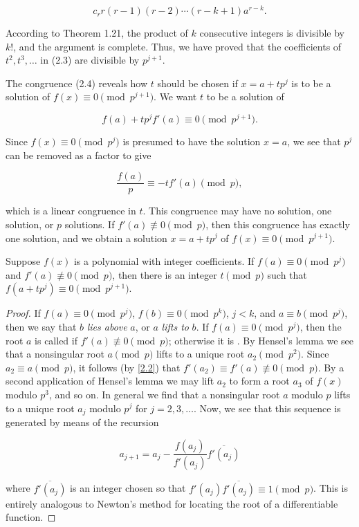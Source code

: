 \documentclass[11pt]{article}
\begin{document}
\[
	c_r r (r - 1)(r - 2) \cdots (r - k + 1) a^{r-k}.
\]

According to Theorem 1.21, the product of \( k \) consecutive integers is divisible by \( k! \), and the argument is complete. Thus, we have proved that the coefficients of \( t^2, t^3, \ldots \) in (2.3) are divisible by \( p^{j+1} \).

The congruence (2.4) reveals how \( t \) should be chosen if \( x = a + tp^j \) is to be a solution of \( f(x) \equiv 0 \pmod{p^{j+1}} \). We want \( t \) to be a solution of

\[
	f(a) + tp^j f'(a) \equiv 0 \pmod{p^{j+1}}.
\]

Since \( f(x) \equiv 0 \pmod{p^j} \) is presumed to have the solution \( x = a \), we see that \( p^j \) can be removed as a factor to give

\[
	\frac{f(a)}{p} \equiv -t f'(a) \pmod{p},
\]

which is a linear congruence in \( t \). This congruence may have no solution, one solution, or \( p \) solutions. If \( f'(a) \not\equiv 0 \pmod{p} \), then this congruence has exactly one solution, and we obtain
a solution \( x = a + tp^j \) of \( f(x) \equiv 0 \pmod{p^{j+1}} \).
\begin{theorem}\label{2.23}
	Suppose \(f(x)\) is a polynomial with integer coefficients. If \(f(a) \equiv 0 \pmod{p^j}\) and \(f'(a) \not \equiv 0 \pmod{p}\), then there is an integer \(t \pmod{p}\) such that \(f(a + tp^j) \equiv 0 \pmod{p^{j+1}}\).
\end{theorem}

\begin{proof}
	If \( f(a) \equiv 0 \pmod{p^j} \), \( f(b) \equiv 0 \pmod{p^k} \), \( j < k \), and \( a \equiv b \pmod{p^j} \), then we say that \( b \) \textit{lies above} \( a \), or \( a \) \textit{lifts to} \( b \). If \( f(a) \equiv 0 \pmod{p^j} \), then the root \( a \) is called  if \( f'(a) \not\equiv 0 \pmod{p} \); otherwise it is . By Hensel's lemma we see that a nonsingular root \( a \pmod{p} \) lifts to a unique root \( a_2 \pmod{p^2} \). Since \( a_2 \equiv a \pmod{p} \), it follows (by \cref{2.2}) that \( f'(a_2) \equiv f'(a) \not\equiv 0 \pmod{p} \). By a second application of Hensel's lemma we may lift \( a_2 \) to form a root \( a_3 \) of \( f(x) \) modulo \( p^3 \), and so on. In general we find that a nonsingular root \( a \) modulo \( p \) lifts to a unique root \( a_j \) modulo \( p^j \) for \( j = 2, 3, \ldots \). Now, we see that this sequence is generated by means of the recursion

	\[
		a_{j+1} = a_j - \frac{f(a_j)}{f'(a_j)} \overline{f'(a_j)}
	\]

	where \( \overline{f'(a_j)} \) is an integer chosen so that \( f'(a_j) \overline{f'(a_j)} \equiv 1 \pmod{p} \). This is entirely analogous to Newton's method for locating the root of a differentiable function.

\end{proof}
\end{document}
